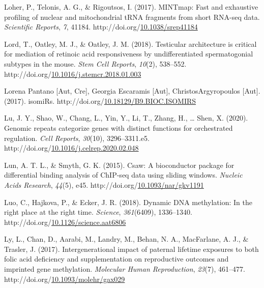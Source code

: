 \documentclass[12pt,twoside]{reedthesis}
\newlength{\cslhangindent}
\newenvironment{CSLReferences}[2] %
 {%
  \setlength{\parindent}{0pt}
  \ifodd #1 \everypar{\setlength{\hangindent}{\cslhangindent}}\ignorespaces\fi
  \ifnum #2 > 0
  \setlength{\parskip}{#2\baselineskip}
  \fi
 }%
 {}
\begin{document}
\begin{CSLReferences}{1}{0}
\leavevmode{}%
Loher, P., Telonis, A. G., \& Rigoutsos, I. (2017). MINTmap: Fast and exhaustive profiling of nuclear and mitochondrial tRNA fragments from short RNA-seq data. \emph{Scientific Reports}, \emph{7}, 41184. http://doi.org/\href{https://doi.org/10.1038/srep41184}{10.1038/srep41184}

\leavevmode{}%
Lord, T., Oatley, M. J., \& Oatley, J. M. (2018). Testicular architecture is critical for mediation of retinoic acid responsiveness by undifferentiated spermatogonial subtypes in the mouse. \emph{Stem Cell Reports}, \emph{10}(2), 538--552. http://doi.org/\href{https://doi.org/10.1016/j.stemcr.2018.01.003}{10.1016/j.stemcr.2018.01.003}

\leavevmode{}%
Lorena Pantano {[}Aut, Cre{]}, Georgia Escaramis {[}Aut{]}, ChristosArgyropoulos {[}Aut{]}. (2017). isomiRs. http://doi.org/\href{https://doi.org/10.18129/B9.BIOC.ISOMIRS}{10.18129/B9.BIOC.ISOMIRS}

\leavevmode{}%
Lu, J. Y., Shao, W., Chang, L., Yin, Y., Li, T., Zhang, H., \ldots{} Shen, X. (2020). Genomic repeats categorize genes with distinct functions for orchestrated regulation. \emph{Cell Reports}, \emph{30}(10), 3296--3311.e5. http://doi.org/\href{https://doi.org/10.1016/j.celrep.2020.02.048}{10.1016/j.celrep.2020.02.048}

\leavevmode{}%
Lun, A. T. L., \& Smyth, G. K. (2015). Csaw: A bioconductor package for differential binding analysis of ChIP-seq data using sliding windows. \emph{Nucleic Acids Research}, \emph{44}(5), e45. http://doi.org/\href{https://doi.org/10.1093/nar/gkv1191}{10.1093/nar/gkv1191}

\leavevmode{}%
Luo, C., Hajkova, P., \& Ecker, J. R. (2018). Dynamic DNA methylation: In the right place at the right time. \emph{Science}, \emph{361}(6409), 1336--1340. http://doi.org/\href{https://doi.org/10.1126/science.aat6806}{10.1126/science.aat6806}

\leavevmode{}%
Ly, L., Chan, D., Aarabi, M., Landry, M., Behan, N. A., MacFarlane, A. J., \& Trasler, J. (2017). Intergenerational impact of paternal lifetime exposures to both folic acid deficiency and supplementation on reproductive outcomes and imprinted gene methylation. \emph{Molecular Human Reproduction}, \emph{23}(7), 461--477. http://doi.org/\href{https://doi.org/10.1093/molehr/gax029}{10.1093/molehr/gax029}


\end{CSLReferences}
\end{document}
